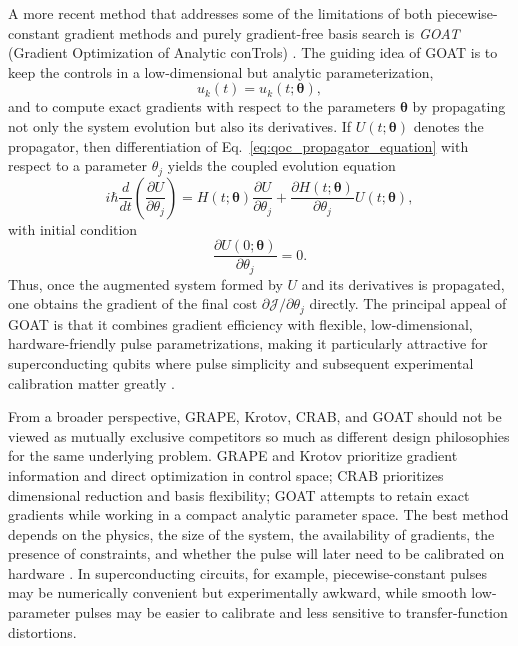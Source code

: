 A more recent method that addresses some of the limitations of both piecewise-constant gradient methods and purely gradient-free basis search is \emph{GOAT} (Gradient Optimization of Analytic conTrols) \cite{Machnes2018}. The guiding idea of GOAT is to keep the controls in a low-dimensional but analytic parameterization,
\begin{equation}
u_k(t)=u_k(t;\bm{\theta}),
\label{eq:goat_analytic_controls}
\end{equation}
and to compute exact gradients with respect to the parameters $\bm{\theta}$ by propagating not only the system evolution but also its derivatives. If $U(t;\bm{\theta})$ denotes the propagator, then differentiation of Eq.~\eqref{eq:qoc_propagator_equation} with respect to a parameter $\theta_j$ yields the coupled evolution equation
\begin{equation}
i\hbar \frac{d}{dt}
\left(
\frac{\partial U}{\partial \theta_j}
\right)
=
H(t;\bm{\theta})
\frac{\partial U}{\partial \theta_j}
+
\frac{\partial H(t;\bm{\theta})}{\partial \theta_j}
U(t;\bm{\theta}),
\label{eq:goat_derivative_equation}
\end{equation}
with initial condition
\begin{equation}
\frac{\partial U(0;\bm{\theta})}{\partial \theta_j}=0.
\label{eq:goat_derivative_initial}
\end{equation}
Thus, once the augmented system formed by $U$ and its derivatives is propagated, one obtains the gradient of the final cost $\partial \mathcal{J}/\partial \theta_j$ directly. The principal appeal of GOAT is that it combines gradient efficiency with flexible, low-dimensional, hardware-friendly pulse parametrizations, making it particularly attractive for superconducting qubits where pulse simplicity and subsequent experimental calibration matter greatly \cite{Machnes2018}.

From a broader perspective, GRAPE, Krotov, CRAB, and GOAT should not be viewed as mutually exclusive competitors so much as different design philosophies for the same underlying problem. GRAPE and Krotov prioritize gradient information and direct optimization in control space; CRAB prioritizes dimensional reduction and basis flexibility; GOAT attempts to retain exact gradients while working in a compact analytic parameter space. The best method depends on the physics, the size of the system, the availability of gradients, the presence of constraints, and whether the pulse will later need to be calibrated on hardware \cite{Khaneja2005,Caneva2011,Machnes2018}. In superconducting circuits, for example, piecewise-constant pulses may be numerically convenient but experimentally awkward, while smooth low-parameter pulses may be easier to calibrate and less sensitive to transfer-function distortions.

